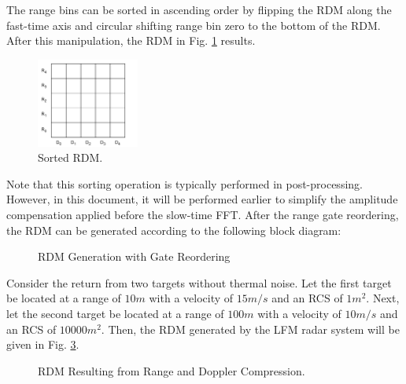 \documentclass[conference]{IEEEtran}
\begin{document}
\noindent
The range bins can be sorted in ascending order by flipping the RDM along the fast-time axis and circular shifting range bin zero to the bottom of the RDM. After this manipulation, the RDM in Fig. \ref{sorted_rdm} results.
\begin{figure}[H]
\centerline{\includegraphics[width=0.3\textwidth]{sorted_rdm.png}}
\caption{Sorted RDM.}
\label{sorted_rdm}
\end{figure}
\noindent
Note that this sorting operation is typically performed in post-processing. However, in this document, it will be performed earlier to simplify the amplitude compensation applied before the slow-time FFT. After the range gate reordering, the RDM can be generated according to the following block diagram:
\begin{figure}[H]
\centerline{}
\caption{RDM Generation with Gate Reordering}
\label{gate_reordering_bd}
\end{figure}
\par
Consider the return from two targets without thermal noise. Let the first target be located at a range of $10m$ with a velocity of $15m/s$ and an RCS of $1m^2$. Next, let the second target be located at a range of $100m$ with a velocity of $10m/s$ and an RCS of $10000m^2$. Then, the RDM generated by the LFM radar system will be given in Fig. \ref{rdm_range_doppler_compression}.
\begin{figure}[H]
\centerline{}
\caption{RDM Resulting from Range and Doppler Compression.}
\label{rdm_range_doppler_compression}
\end{figure}
\end{document}
